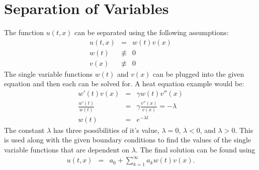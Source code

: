 \documentclass{article}
\newcommand{\bea}{\begin{eqnarray*}}
\newcommand{\eea}{\end{eqnarray*}}
\begin{document}
\section{Separation of Variables}

The function $u(t,x)$ can be separated using the following assumptions:
\bea
u(t,x) &=&  w(t)v(x)\\
w(t) &\not\equiv& 0\\
v(x) &\not\equiv& 0
\eea
The single variable functions $w(t)$ and $v(x)$ can be plugged into the given equation and then each can be solved for. A heat equation example would be:
\bea
w'(t)v(x) &=& \gamma w(t)v''(x)\\
\frac{w'(t)}{w(t)} &=& \gamma \frac{v''(x)}{v(x)} = -\lambda \\
w(t) &=& e^{-\lambda t}
\eea
The constant $\lambda$ has three possibilities of it's value, $\lambda = 0$, $\lambda < 0$, and $\lambda > 0 $. This is used along with the given boundary conditions to find the values of the single variable functions that are dependent on $\lambda$. The final solution can be found using
\bea
u(t,x) &=& a_0 + \sum_{k=1}^{\infty}{a_kw(t)v(x)}.
\eea
\end{document}
